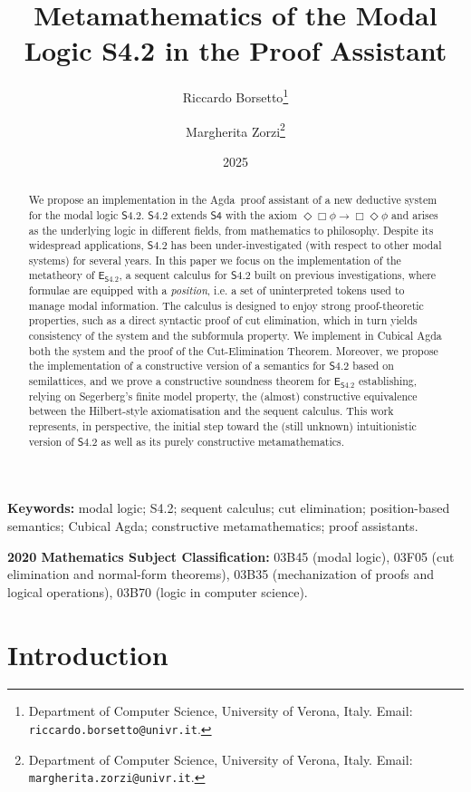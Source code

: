 \documentclass{article}
\title{Metamathematics of the Modal Logic S4.2 in the \agda{} Proof Assistant}
\author{
  Riccardo Borsetto\thanks{Department of Computer Science, University of Verona, Italy.
    Email: \texttt{riccardo.borsetto@univr.it}.} \and
  Margherita Zorzi\thanks{Department of Computer Science, University of Verona, Italy.
    Email: \texttt{margherita.zorzi@univr.it}.}
}
\date{2025}
\newcommand{\logic}{\mathsf{S4.2}}
\newcommand{\axname}[1]{\mathsf{#1}}
\newcommand{\agda}{\textsf{Agda}}
\newcommand{\cubical}{\textsf{Cubical Agda}}
\theoremstyle{definition}
\begin{document}
\maketitle

\begin{abstract}
    We propose an implementation in the \agda{}~proof assistant of a new deductive system for the modal logic $\logic$. $\logic$ extends $\axname{S4}$ with the axiom $\Diamond\Box\phi \rightarrow \Box\Diamond\phi$ and arises as the underlying logic in different fields, from mathematics to philosophy.
    Despite its widespread applications, $\logic$ has been under-investigated (with respect to other modal systems) for several years. In this paper we focus on the implementation of the metatheory of $\mathsf{E}_{\logic}$, a sequent calculus for $\logic$ built on previous investigations, where formulae are equipped with a \emph{position}, i.e. a set of uninterpreted tokens used to manage modal information. The calculus is designed to enjoy strong proof-theoretic properties, such as a direct syntactic proof of cut elimination, which in turn yields consistency of the system and the subformula property. We implement in \cubical{} both the system and the proof of the Cut-Elimination Theorem. Moreover, we propose the implementation of a constructive version of a semantics for $\logic$ based on semilattices, and we prove a constructive soundness theorem for $\mathsf{E}_{\logic}$ establishing, relying on Segerberg's finite model property, the (almost) constructive equivalence between the Hilbert-style axiomatisation and the sequent calculus.
    This work represents, in perspective, the initial step toward the (still unknown) intuitionistic version of $\logic$ as well as its purely constructive metamathematics.
\end{abstract}

\vspace{1em}
\noindent\textbf{Keywords:} modal logic; S4.2; sequent calculus; cut elimination;
position-based semantics; Cubical Agda; constructive metamathematics;
proof assistants.

\vspace{0.5em}
\noindent\textbf{2020 Mathematics Subject Classification:}
03B45 (modal logic),
03F05 (cut elimination and normal-form theorems),
03B35 (mechanization of proofs and logical operations),
03B70 (logic in computer science).


\section{Introduction}\label{sec:introduction}
\end{document}
